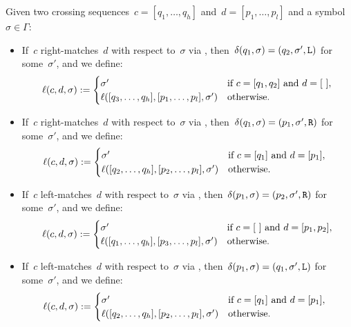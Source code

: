 \begin{defn}
	Given two crossing sequences~$c=[q_1,\dots,q_h]$ and~$d=[p_1,\dots,p_l]$ and a symbol~$\sigma\in\Gamma$:
	\begin{itemize}
		\item If~$c$ right-matches~$d$ with respect to~$\sigma$ via , then~$\delta(q_1,\sigma)=(q_2,\sigma',\mathtt L)$ for some~$\sigma'$, and we define:
		      \begin{equation*}
			      \ell(c,d,\sigma):=\begin{cases}
				      \sigma'                                        & \text{if } c=[q_1,q_2] \text{ and } d=[~], \\
				      \ell([q_3,\dots,q_h],[p_1,\dots,p_l],\sigma') & \text{otherwise}.
			      \end{cases}
		      \end{equation*}
		\item If~$c$ right-matches~$d$ with respect to~$\sigma$ via , then~$\delta(q_1,\sigma)=(p_1,\sigma',\mathtt R)$ for some~$\sigma'$, and we define:
		      \begin{equation*}
			      \ell(c,d,\sigma):=\begin{cases}
				      \sigma'                                        & \text{if } c=[q_1] \text{ and } d=[p_1],~~ \\
				      \ell([q_2,\dots,q_h],[p_2,\dots,p_l],\sigma') & \text{otherwise}.
			      \end{cases}
		      \end{equation*}
		\item If~$c$ left-matches~$d$ with respect to~$\sigma$ via , then~$\delta(p_1,\sigma)=(p_2,\sigma',\mathtt R)$ for some~$\sigma'$, and we define:
		      \begin{equation*}
			      \ell(c,d,\sigma):=\begin{cases}
				      \sigma'                                        & \text{if } c=[~] \text{ and } d=[p_1,p_2], \\
				      \ell([q_1,\dots,q_h],[p_3,\dots,p_l],\sigma') & \text{otherwise}.
			      \end{cases}
		      \end{equation*}
		\item If~$c$ left-matches~$d$ with respect to~$\sigma$ via , then~$\delta(p_1,\sigma)=(q_1,\sigma',\mathtt L)$ for some~$\sigma'$, and we define:
		      \begin{equation*}
			      \ell(c,d,\sigma):=\begin{cases}
				      \sigma'                                        & \text{if } c=[q_1] \text{ and } d=[p_1],~~ \\
				      \ell([q_2,\dots,q_h],[p_2,\dots,p_l],\sigma') & \text{otherwise}.
			      \end{cases}
		      \end{equation*}
	\end{itemize}
\end{defn}

